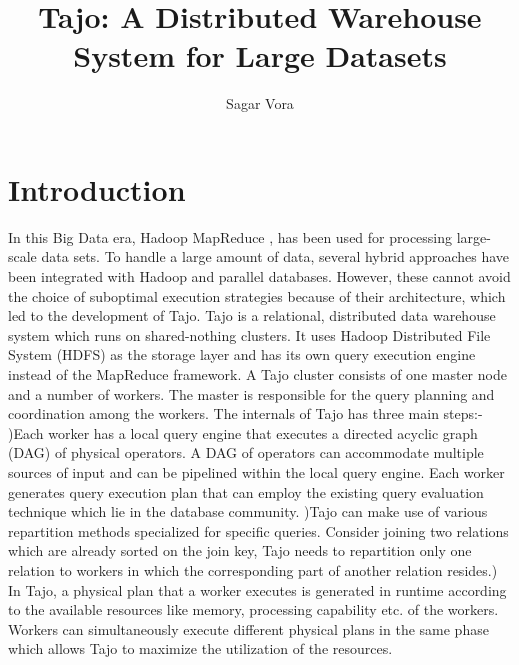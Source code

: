 \documentclass[9pt,twocolumn,twoside]{styles/osajnl}
\title{Tajo: A Distributed Warehouse System for Large Datasets}
\author[1]{Sagar Vora}
\affil[1]{School of Informatics and Computing, Bloomington, IN 47408, U.S.A.}
\begin{document}
\maketitle

\section{Introduction}
In this Big Data era, Hadoop MapReduce
\cite{www-apache-hadoop}\cite{mapreduce-article}, has been used for
processing large-scale data sets. To handle a large amount of data,
several hybrid approaches have been integrated with Hadoop and
parallel databases. However, these cannot avoid the choice of
suboptimal execution strategies because of their architecture, which
led to the development of Tajo. \cite{www-apache-tajo} Tajo is a
relational, distributed data warehouse system which runs on
shared-nothing clusters. It uses Hadoop Distributed File System (HDFS)
as the storage layer and has its own query execution engine instead of
the MapReduce framework. A Tajo cluster consists of one master node
and a number of workers. The master is responsible for the query
planning and coordination among the workers. \newline \newline
\cite{tajo-paper}The internals of Tajo has three main
steps:- )Each worker has a local query engine that executes a
directed acyclic graph (DAG) of physical operators. A DAG of operators
can accommodate multiple sources of input and can be pipelined within
the local query engine. Each worker generates query execution plan
that can employ the existing query evaluation technique
\cite{query-evaluation-article} \cite{query-processing-article} which
lie in the database community. )Tajo can make use of various
repartition methods specialized for specific queries. Consider joining
two relations which are already sorted on the join key, Tajo needs to
repartition only one relation to workers in which the corresponding
part of another relation resides.) In Tajo, a physical plan that a
worker executes is generated in runtime according to the available
resources like memory, processing capability etc. of the
workers. Workers can simultaneously execute different physical plans
in the same phase which allows Tajo to maximize the utilization of the
resources.
\end{document}
